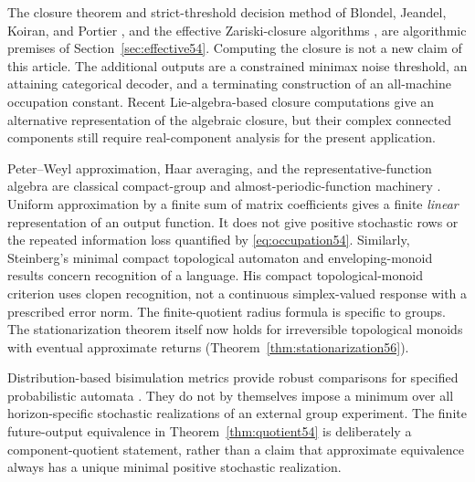 The closure theorem and strict-threshold decision method of Blondel, Jeandel, Koiran, and Portier \cite{BJKP}, and the effective Zariski-closure algorithms \cite{DJK,NPSW}, are algorithmic premises of Section~\ref{sec:effective54}. Computing the closure is not a new claim of this article. The additional outputs are a constrained minimax noise threshold, an attaining categorical decoder, and a terminating construction of an all-machine occupation constant. Recent Lie-algebra-based closure computations \cite{deGraaf} give an alternative representation of the algebraic closure, but their complex connected components still require real-component analysis for the present application.

Peter--Weyl approximation, Haar averaging, and the representative-function algebra are classical compact-group and almost-periodic-function machinery \cite{Folland}. Uniform approximation by a finite sum of matrix coefficients gives a finite \emph{linear} representation of an output function. It does not give positive stochastic rows or the repeated information loss quantified by \eqref{eq:occupation54}. Similarly, Steinberg's minimal compact topological automaton and enveloping-monoid results \cite[Theorems 2.2 and 2.6]{Steinberg} concern recognition of a language. His compact topological-monoid criterion \cite[Proposition 2.8]{Steinberg} uses clopen recognition, not a continuous simplex-valued response with a prescribed error norm. The finite-quotient radius formula is specific to groups. The stationarization theorem itself now holds for irreversible topological monoids with eventual approximate returns (Theorem~\ref{thm:stationarization56}).

Distribution-based bisimulation metrics provide robust comparisons for specified probabilistic automata \cite{FSZ}. They do not by themselves impose a minimum over all horizon-specific stochastic realizations of an external group experiment. The finite future-output equivalence in Theorem~\ref{thm:quotient54} is deliberately a component-quotient statement, rather than a claim that approximate equivalence always has a unique minimal positive stochastic realization.

